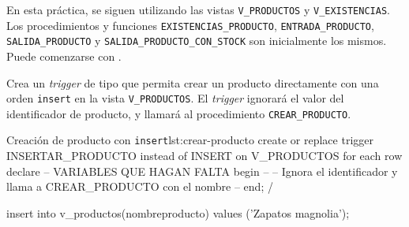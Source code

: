 En esta práctica, se siguen utilizando las vistas \texttt{V\_PRODUCTOS} y \texttt{V\_EXISTENCIAS}. Los procedimientos y funciones \texttt{EXISTENCIAS\_PRODUCTO}, \texttt{ENTRADA\_PRODUCTO}, \texttt{SALIDA\_PRODUCTO} y \texttt{SALIDA\_PRODUCTO\_CON\_STOCK} son inicialmente los mismos. Puede comenzarse con .


\begin{homeworkProblem}
  Crea un \textit{trigger} de tipo  que permita crear un producto directamente con una orden \texttt{insert} en la vista \texttt{V\_PRODUCTOS}. El \textit{trigger} ignorará el valor del identificador de producto, y llamará al procedimiento \texttt{CREAR\_PRODUCTO}.
  
  \begin{listadosql}{Creación de producto con \texttt{insert}}{lst:crear-producto}
create or replace trigger INSERTAR_PRODUCTO
instead of INSERT on V_PRODUCTOS
for each row
declare
  -- VARIABLES QUE HAGAN FALTA
begin
  -- 
  -- Ignora el identificador y llama a CREAR_PRODUCTO con el nombre
  -- 
end;
/


insert into v_productos(nombreproducto) values ('Zapatos magnolia');

\end{listadosql}

\end{homeworkProblem}

